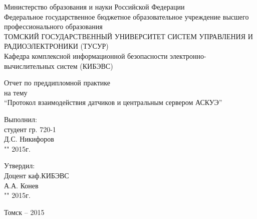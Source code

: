 \newpage
{}

\begin{center}
Министерство образования и науки Российской Федерации\\
Федеральное государственное бюджетное образовательное учреждение высшего профессионального образования\\
ТОМСКИЙ ГОСУДАРСТВЕННЫЙ УНИВЕРСИТЕТ СИСТЕМ УПРАВЛЕНИЯ И РАДИОЭЛЕКТРОНИКИ (ТУСУР)\\
Кафедра комплексной информационной безопасности электронно-вычислительных систем (КИБЭВС)\\
\end{center}

\vspace{2cm}

\begin{center}
Отчет по преддипломной практике \\
на тему \\
``Протокол взаимодействия датчиков и центральным сервером АСКУЭ''
\end{center}

\vspace{2cm}

\begin{flushright}
Выполнил: \\
студент гр. 720-1 \\
\underline{\hspace{2.5cm}}Д.С. Никифоров \\
"\underline{\hspace{1cm}}"\underline{\hspace{3cm}} 2015г.\\
\end{flushright}

\begin{flushright}
Утвердил: \\
Доцент каф.КИБЭВС \\
\underline{\hspace{2.5cm}}А.А. Конев \\
"\underline{\hspace{1cm}}"\underline{\hspace{3cm}} 2015г.\\
\end{flushright}

\vfill
\begin{center}
Томск -- 2015
\end{center}